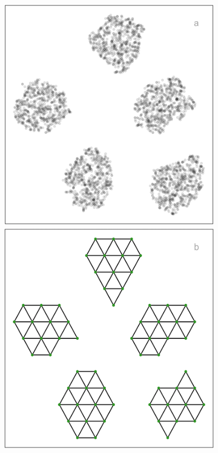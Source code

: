\documentclass[
  12pt]{article}
\begin{document}
\begin{figure}[H]

\begin{minipage}{0.33\linewidth}
\includegraphics{figures/five_gau_clusters/tsne_layout.png}\end{minipage}%
%
\begin{minipage}{0.33\linewidth}
\includegraphics{figures/five_gau_clusters/2d_model_tsne.png}\end{minipage}%

\end{figure}
\end{document}
